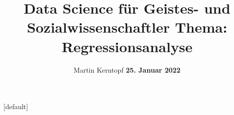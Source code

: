 \documentclass[aspectratio=169, journal, x11names, unknownkeysallowed, hyperref={colorlinks,
linkcolor = SS2,
urlcolor  = F3,
citecolor = F3,
anchorcolor = A4}, 12pt]{beamer}
\begin{document}
\institute[IRTG] {
\begin{minipage}{\textwidth}
\vspace{-15em}
\hspace*{31em}
\hspace{1em}
\end{minipage}
}

\title[Research Data Management]{
  \vspace*{-5em} 
\textbf{Data Science für Geistes- und Sozialwissenschaftler} \linebreak  Thema: Regressionsanalyse
}

\author[Me]{\footnotesize\textcolor{PN3}{Martin Kerntopf} \linebreak \textbf{25. Januar 2022}} 
\date{}


\frame[plain]{\titlepage}
[default]
\end{document}
